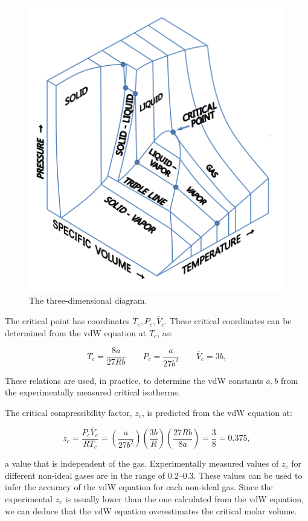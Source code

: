 \documentclass[
  9pt,
]{extbook}
\theoremstyle{definition}
\theoremstyle{definition}
\theoremstyle{definition}
\theoremstyle{definition}
\theoremstyle{remark}
\begin{document}
\begin{figure}

{\centering \includegraphics[width=0.5\linewidth]{./img/PVT_3D_diagram} 

}

\caption{The three-dimensional diagram.}\label{fig:FigTPVd}
\end{figure}

The critical point has coordinates \({T_c,P_c, \overline{V}_c}\). These critical coordinates can be determined from the vdW equation at \(T_c\), as:

\begin{equation}
T_c=\frac{8a}{27Rb} \qquad P_c=\frac{a}{27b^2} \qquad \overline{V}_c=3b, 
\label{eq:criticpt}
\end{equation}

These relations are used, in practice, to determine the vdW constants \(a,b\) from the experimentally measured critical isotherms.

The critical compressibility factor, \(z_c\), is predicted from the vdW equation at:

\begin{equation}
z_c=\frac{P_c \overline{V}_c}{R T_c}=\left( \frac{a}{27b^2} \right) \left( \frac{3b}{R} \right) \left( \frac{27Rb}{8a} \right) = \frac{3}{8} = 0.375,
\label{eq:critiz}
\end{equation}

a value that is independent of the gas. Experimentally measured values of \(z_c\) for different non-ideal gases are in the range of 0.2--0.3. These values can be used to infer the accuracy of the vdW equation for each non-ideal gas. Since the experimental \(z_c\) is usually lower than the one calculated from the vdW equation, we can deduce that the vdW equation overestimates the critical molar volume.
\end{document}
